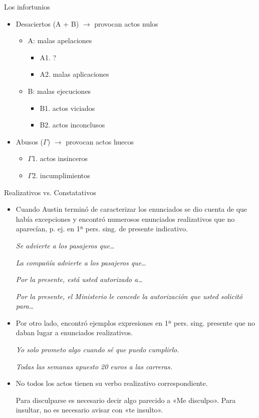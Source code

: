\documentclass{beamer}
\begin{document}
\begin{frame}{Los infortunios}

\begin{itemize}
	\item Desaciertos (A + B) $\rightarrow$ provocan actos nulos
	\begin{itemize}
		\item A: malas apelaciones
		\begin{itemize}
			\item A1. ?
			\item A2. malas aplicaciones
		\end{itemize}
		\item B: malas ejecuciones
		\begin{itemize}
			\item B1. actos viciados
			\item B2. actos inconclusos
		\end{itemize}
	\end{itemize}
	\item Abusos ($\Gamma$) $\rightarrow$ provocan actos huecos
	\begin{itemize}
		\item $\Gamma$1. actos insinceros
		\item $\Gamma$2. incumplimientos
	\end{itemize}
\end{itemize}

\end{frame}

\begin{frame}{Realizativos vs. Constatativos}

\begin{itemize}
	\item Cuando Austin terminó de caracterizar los enunciados se dio cuenta de que había excepciones y encontró numerosos enunciados realizativos que no aparecían, p. ej. en 1ª pers. sing. de presente indicativo.
	
	\it{Se advierte a los pasajeros que\ldots}
	
	\it{La compañía advierte a los pasajeros que\ldots}

	\it{Por la presente, está usted autorizado a\ldots}

	\it{Por la presente, el Ministerio le concede la autorización que usted solicitó para\ldots}
	
	\item Por otro lado, encontró ejemplos expresiones en 1ª pers. sing. presente que no daban lugar a enunciados realizativos.
	
	\it{Yo solo prometo algo cuando sé que puedo cumplirlo.}

	\it{Todas las semanas apuesto 20 euros a las carreras.}

	\item No todos los actos tienen su verbo realizativo correspondiente.
	
	Para disculparse es necesario decir algo parecido a «Me disculpo». Para insultar, no es necesario avisar con «te insulto».
\end{itemize}

\end{frame}
\end{document}
